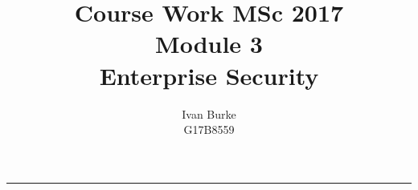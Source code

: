 \documentclass[12pt, british]{article}
\begin{document}
%

\title{Course Work MSc 2017\\
Module 3\\
Enterprise Security}


\author{Ivan Burke\\
G17B8559}

\maketitle
\noindent \begin{center}
\rule[0.5ex]{1\linewidth}{1pt}
\par\end{center}

\def\thesection{\Alph{section}}









  
 
\end{document}
